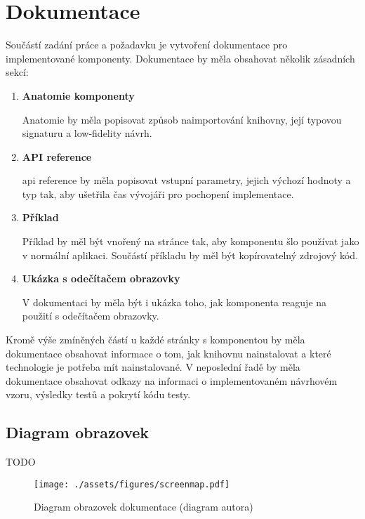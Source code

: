 \clearpage

\section{Dokumentace}

Součástí zadání práce a požadavku \hyperref[nfr14]{} je vytvoření dokumentace pro implementované komponenty.
Dokumentace by měla obsahovat několik zásadních sekcí:

\begin{enumerate}
    \item \textbf{Anatomie komponenty}

          Anatomie by měla popisovat způsob naimportování knihovny, její typovou signaturu a low-fidelity návrh.

    \item \textbf{API reference}

          \gls{api} reference by měla popisovat vstupní parametry, jejich výchozí hodnoty a typ tak, aby ušetřila čas vývojáři pro pochopení implementace.

    \item \textbf{Příklad}

          Příklad by měl být vnořený na stránce tak, aby komponentu šlo používat jako v normální aplikaci. Součástí příkladu by měl být kopírovatelný zdrojový kód.

    \item \textbf{Ukázka s odečítačem obrazovky}

          V dokumentaci by měla být i ukázka toho, jak komponenta reaguje na použití s odečítačem obrazovky.

\end{enumerate}

Kromě výše zmíněných částí u každé stránky s komponentou by měla dokumentace obsahovat informace o tom, jak knihovnu nainstalovat a které technologie je potřeba mít nainstalované.
V neposlední řadě by měla dokumentace obsahovat odkazy na informaci o implementovaném návrhovém vzoru, výsledky testů a pokrytí kódu testy.

\clearpage

\subsection{Diagram obrazovek}

TODO

\begin{figure}[htp]
    \centering
    \texttt{[image: ./assets/figures/screenmap.pdf]}
    \captionsetup{justification=centering}
    \caption{Diagram obrazovek dokumentace (diagram autora)}
\end{figure}
